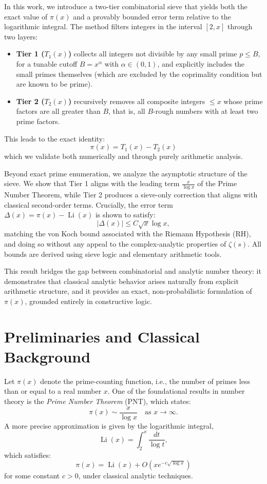 \documentclass[11pt]{article}
\begin{document}
	In this work, we introduce a two-tier combinatorial sieve that yields both the exact value of \( \pi(x) \) and a provably bounded error term relative to the logarithmic integral. The method filters integers in the interval \( [2, x] \) through two layers:
	
	\begin{itemize}
		\item \textbf{Tier 1 ($T_1(x)$)} collects all integers not divisible by any small prime \( p \leq B \), for a tunable cutoff \( B = x^\alpha \) with \( \alpha \in (0, 1) \), and explicitly includes the small primes themselves (which are excluded by the coprimality condition but are known to be prime).
		
		\item \textbf{Tier 2 ($T_2(x)$)} recursively removes all composite integers \( \le x \) whose prime factors are all greater than \( B \), that is, all \( B \)-rough numbers with at least two prime factors.
	\end{itemize}

	
	This leads to the exact identity:
	\[
	\pi(x) = T_1(x) - T_2(x)
	\]
	which we validate both numerically and through purely arithmetic analysis.
	
	Beyond exact prime enumeration, we analyze the asymptotic structure of the sieve. We show that Tier 1 aligns with the leading term $\frac{x}{\log x}$ of the Prime Number Theorem, while Tier 2 produces a sieve-only correction that aligns with classical second-order terms. Crucially, the error term $\Delta(x) = \pi(x) - \operatorname{Li}(x)$ is shown to satisfy:
	\[
	|\Delta(x)| \leq C \sqrt{x} \log x,
	\]
	matching the von Koch bound associated with the Riemann Hypothesis (RH), and doing so without any appeal to the complex-analytic properties of $\zeta(s)$. All bounds are derived using sieve logic and elementary arithmetic tools.
	
	This result bridges the gap between combinatorial and analytic number theory: it demonstrates that classical analytic behavior arises naturally from explicit arithmetic structure, and it provides an exact, non-probabilistic formulation of \( \pi(x) \), grounded entirely in constructive logic.

	
	\section{Preliminaries and Classical Background}
	
	Let \( \pi(x) \) denote the prime-counting function, i.e., the number of primes less than or equal to a real number \( x \). One of the foundational results in number theory is the \textit{Prime Number Theorem} (PNT), which states:
	\[
	\pi(x) \sim \frac{x}{\log x} \quad \text{as } x \to \infty.
	\]
	A more precise approximation is given by the logarithmic integral,
	\[
	\operatorname{Li}(x) = \int_2^x \frac{dt}{\log t},
	\]
	which satisfies:
	\[
	\pi(x) = \operatorname{Li}(x) + O\left(x e^{-c\sqrt{\log x}}\right)
	\]
	for some constant \( c > 0 \), under classical analytic techniques.
	
\end{document}
